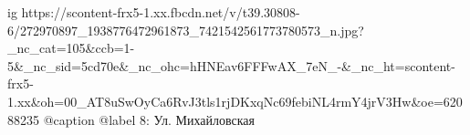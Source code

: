  
 
 
 
 

\ifcmt
  ig https://scontent-frx5-1.xx.fbcdn.net/v/t39.30808-6/272970897_1938776472961873_7421542561773780573_n.jpg?_nc_cat=105&ccb=1-5&_nc_sid=5cd70e&_nc_ohc=hHNEav6FFFwAX_7eN_-&_nc_ht=scontent-frx5-1.xx&oh=00_AT8uSwOyCa6RvJ3tls1rjDKxqNc69febiNL4rmY4jrV3Hw&oe=62088235
  @caption @label 8: Ул. Михайловская
\fi
